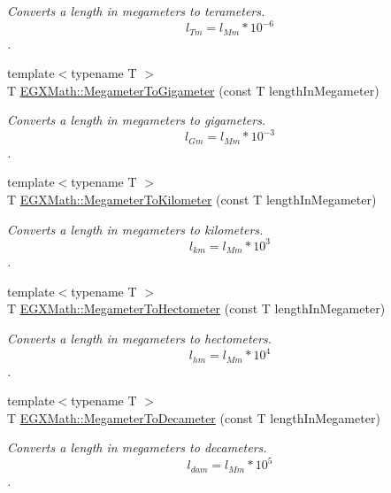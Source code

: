\begin{DoxyCompactItemize}
\begin{DoxyCompactList}\small\item\em Converts a length in megameters to terameters. \[ l_{Tm}=l_{Mm} * 10^{-6} \]. \end{DoxyCompactList}\item 
{\footnotesize template$<$typename T $>$ }\\T \mbox{\hyperlink{group___e_g_x_math-_conversions-_length_conversions-_s_i-_megameter-_s_i_gaa59e3194a054aeb6623886f72e245103}{E\+G\+X\+Math\+::\+Megameter\+To\+Gigameter}} (const T length\+In\+Megameter)
\begin{DoxyCompactList}\small\item\em Converts a length in megameters to gigameters. \[ l_{Gm}=l_{Mm} * 10^{-3} \]. \end{DoxyCompactList}\item 
{\footnotesize template$<$typename T $>$ }\\T \mbox{\hyperlink{group___e_g_x_math-_conversions-_length_conversions-_s_i-_megameter-_s_i_gac428a2600cebd4a837801bef72380560}{E\+G\+X\+Math\+::\+Megameter\+To\+Kilometer}} (const T length\+In\+Megameter)
\begin{DoxyCompactList}\small\item\em Converts a length in megameters to kilometers. \[ l_{km}=l_{Mm} * 10^{3} \]. \end{DoxyCompactList}\item 
{\footnotesize template$<$typename T $>$ }\\T \mbox{\hyperlink{group___e_g_x_math-_conversions-_length_conversions-_s_i-_megameter-_s_i_gad3460fd29fbb8232307cb7cb7265edce}{E\+G\+X\+Math\+::\+Megameter\+To\+Hectometer}} (const T length\+In\+Megameter)
\begin{DoxyCompactList}\small\item\em Converts a length in megameters to hectometers. \[ l_{hm}=l_{Mm} * 10^{4} \]. \end{DoxyCompactList}\item 
{\footnotesize template$<$typename T $>$ }\\T \mbox{\hyperlink{group___e_g_x_math-_conversions-_length_conversions-_s_i-_megameter-_s_i_ga7e758185a466f8ac5f956650312b9019}{E\+G\+X\+Math\+::\+Megameter\+To\+Decameter}} (const T length\+In\+Megameter)
\begin{DoxyCompactList}\small\item\em Converts a length in megameters to decameters. \[ l_{dam}=l_{Mm} * 10^{5} \]. \end{DoxyCompactList}\item 

\end{DoxyCompactItemize}

